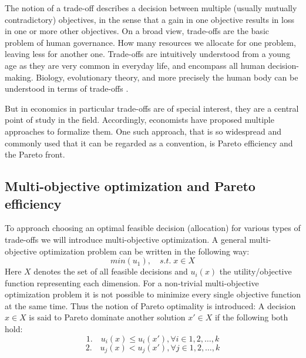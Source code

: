 

	The notion of a trade-off describes a decision between multiple (usually mutually contradictory) objectives, in the sense that a gain in one objective results in loss in one or more other objectives.
	On a broad view, trade-offs are the basic problem of human governance.
    How many resources we allocate for one problem, leaving less for another one.
	Trade-offs are intuitively understood from a young age as they are very common in everyday life, and encompass all human decision-making.
	Biology, evolutionary theory, and more precisely the human body can be understood in terms of trade-offs \cite{Launer2020}.

	But in economics in particular trade-offs are of special interest, they are a central point of study in the field.
	Accordingly, economists have proposed multiple approaches to formalize them.
	One such approach, that is so widespread and commonly used that it can be regarded as a convention, is Pareto efficiency and the Pareto front.

	\subsection{Multi-objective optimization and Pareto efficiency}

	To approach choosing an optimal feasible decision (allocation) for various types of trade-offs we will introduce multi-objective optimization.
	A general multi-objective optimization problem can be written in the following way:
	$$min(u_1), \quad s.t.\; x\in X$$
	Here $X$ denotes the set of all feasible decisions and $u_i(x)$ the utility/objective function representing each dimension.
	For a non-trivial multi-objective optimization problem it is not possible to minimize every single objective function at the same time.
	Thus the notion of Pareto optimality is introduced:
	A decision $x\in X$ is said to Pareto dominate another solution $x'\in X$ if the following both hold:
	$$1.\quad u_i(x)\le u_i(x'), \forall i\in {1,2,\dots,k}$$
	$$2. \quad u_j(x) < u_j(x'), \forall j\in {1,2,\dots,k}$$

